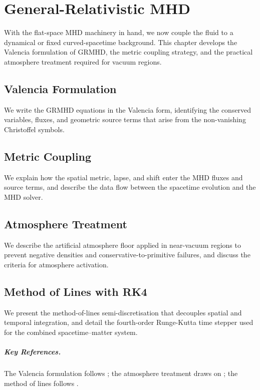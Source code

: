 \chapter{General-Relativistic MHD}
\label{ch:grmhd}

With the flat-space MHD machinery in hand, we now couple the fluid to a
dynamical or fixed curved-spacetime background. This chapter develops the
Valencia formulation of GRMHD, the metric coupling strategy, and the
practical atmosphere treatment required for vacuum regions.

\section{Valencia Formulation}
\label{sec:grmhd-valencia}

We write the GRMHD equations in the Valencia form, identifying the conserved
variables, fluxes, and geometric source terms that arise from the
non-vanishing Christoffel symbols.

\section{Metric Coupling}
\label{sec:grmhd-metric}

We explain how the spatial metric, lapse, and shift enter the MHD fluxes
and source terms, and describe the data flow between the spacetime evolution
and the MHD solver.

\section{Atmosphere Treatment}
\label{sec:grmhd-atmosphere}

We describe the artificial atmosphere floor applied in near-vacuum regions
to prevent negative densities and conservative-to-primitive failures, and
discuss the criteria for atmosphere activation.

\section{Method of Lines with RK4\starmark{}}
\label{sec:grmhd-mol}

We present the method-of-lines semi-discretisation that decouples spatial and
temporal integration, and detail the fourth-order Runge-Kutta time stepper
used for the combined spacetime--matter system.

\paragraph{Key References.}
The Valencia formulation follows \cite{Banyuls1997,Font2008}; the atmosphere
treatment draws on \cite{Etienne2015}; the method of lines follows
\cite{Hesthaven2007}.
